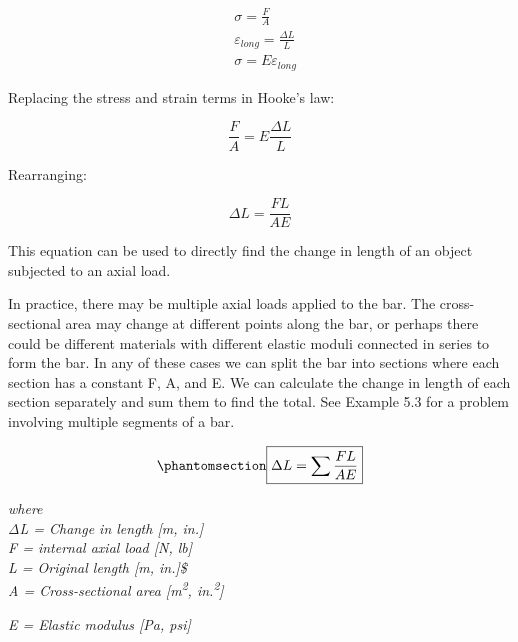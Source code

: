 \documentclass[
  letterpaper,
  DIV=11,
  numbers=noendperiod]{scrreprt}
\theoremstyle{definition}
\theoremstyle{remark}
\begin{document}
\[
\begin{aligned} & \sigma=\frac{F}{A} \\ & \varepsilon_{long}=\frac{\Delta L}{L} \\ & \sigma=E \varepsilon_{long}\end{aligned}\]

Replacing the stress and strain terms in Hooke's law:

\[
\frac{F}{A}=E \frac{\Delta L}{L}\]

Rearranging:

\[
\Delta L=\frac{F L}{A E}\]

This equation can be used to directly find the change in length of an
object subjected to an axial load.

In practice, there may be multiple axial loads applied to the bar. The
cross-sectional area may change at different points along the bar, or
perhaps there could be different materials with different elastic moduli
connected in series to form the bar. In any of these cases we can split
the bar into sections where each section has a constant F, A, and E. We
can calculate the change in length of each section separately and sum
them to find the total. See Example 5.3 for a problem involving multiple
segments of a bar.

\begin{equation}\phantomsection\label{eq-5.2}{
\boxed{\Delta L=\sum \frac{F L}{A E}}}\end{equation}

\emph{where}\\
\emph{ΔL = Change in length {[}m, in.{]}}\\
\emph{F = internal axial load {[}N, lb{]}}\\
\emph{L = Original length {[}m, in.{]}\$}\\
\emph{A = Cross-sectional area {[}m\textsuperscript{2},
in.\textsuperscript{2}{]}}

\emph{E = Elastic modulus {[}Pa, psi{]}}
\end{document}
